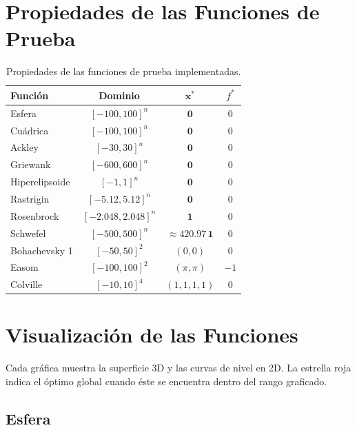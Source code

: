 \documentclass[11pt]{article}
\begin{document}
\section{Propiedades de las Funciones de Prueba}

\begin{table}[H]
\centering
\begin{tabular}{lccc}
\hline\hline
Funci\'on        & Dominio              & $\mathbf{x}^*$               & $f^*$ \\
\hline
Esfera           & $[-100,100]^n$       & $\mathbf{0}$                 & 0 \\
Cu\'adrica       & $[-100,100]^n$       & $\mathbf{0}$                 & 0 \\
Ackley           & $[-30,30]^n$         & $\mathbf{0}$                 & 0 \\
Griewank         & $[-600,600]^n$       & $\mathbf{0}$                 & 0 \\
Hiperelipsoide   & $[-1,1]^n$           & $\mathbf{0}$                 & 0 \\
Rastrigin        & $[-5.12,5.12]^n$     & $\mathbf{0}$                 & 0 \\
Rosenbrock       & $[-2.048,2.048]^n$   & $\mathbf{1}$                 & 0 \\
Schwefel         & $[-500,500]^n$       & $\approx420.97\,\mathbf{1}$  & 0 \\
Bohachevsky 1    & $[-50,50]^2$         & $(0,0)$                      & 0 \\
Easom            & $[-100,100]^2$       & $(\pi,\pi)$                  & $-1$ \\
Colville         & $[-10,10]^4$         & $(1,1,1,1)$                  & 0 \\
\hline\hline
\end{tabular}
\caption{Propiedades de las funciones de prueba implementadas.}
\end{table}

\section{Visualizaci\'on de las Funciones}

Cada gr\'afica muestra la superficie 3D y las curvas de nivel en 2D. La estrella roja indica el \'optimo global cuando \'este se encuentra dentro del rango graficado.

\subsection{Esfera}
\end{document}
